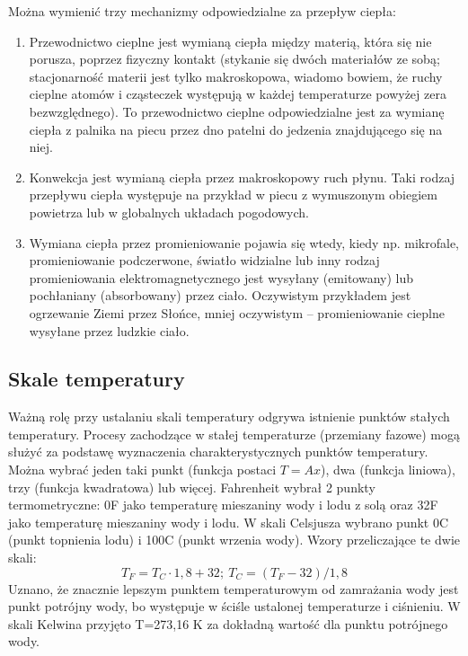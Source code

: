 \documentclass{article}
\begin{document}
Można wymienić trzy mechanizmy odpowiedzialne za przepływ ciepła:
\begin{enumerate} 
    \item Przewodnictwo cieplne jest wymianą ciepła między materią, która się nie porusza, poprzez fizyczny kontakt (stykanie się dwóch materiałów ze sobą; stacjonarność materii jest tylko makroskopowa, wiadomo bowiem, że ruchy cieplne atomów i cząsteczek występują w każdej temperaturze powyżej zera bezwzględnego). To przewodnictwo cieplne odpowiedzialne jest za wymianę ciepła z palnika na piecu przez dno patelni do jedzenia znajdującego się na niej.
    \item Konwekcja jest wymianą ciepła przez makroskopowy ruch płynu. Taki rodzaj przepływu ciepła występuje na przykład w piecu z wymuszonym obiegiem powietrza lub w globalnych układach pogodowych.
    \item Wymiana ciepła przez promieniowanie pojawia się wtedy, kiedy np. mikrofale, promieniowanie podczerwone, światło widzialne lub inny rodzaj promieniowania elektromagnetycznego jest wysyłany (emitowany) lub pochłaniany (absorbowany) przez ciało. Oczywistym przykładem jest ogrzewanie Ziemi przez Słońce, mniej oczywistym – promieniowanie cieplne wysyłane przez ludzkie ciało.
\end{enumerate}

\subsection{Skale temperatury}
Ważną rolę przy ustalaniu skali temperatury odgrywa istnienie punktów stałych temperatury. Procesy zachodzące w stałej temperaturze (przemiany fazowe) mogą służyć za podstawę wyznaczenia charakterystycznych punktów temperatury. Można wybrać jeden taki punkt (funkcja postaci $T=Ax$), dwa (funkcja liniowa), trzy (funkcja kwadratowa) lub więcej. Fahrenheit wybrał 2 punkty termometryczne: 0\degree F jako temperaturę mieszaniny wody i lodu z solą oraz 32\degree F jako temperaturę mieszaniny wody i lodu. W skali Celsjusza wybrano punkt 0\degree C (punkt topnienia lodu) i 100\degree C (punkt wrzenia wody). Wzory przeliczające te dwie skali:
\begin{equation*}
    T_F = T_C\cdot 1,8 + 32; \
    T_C = (T_F-32)/1,8
\end{equation*}
Uznano, że znacznie lepszym punktem temperaturowym od zamrażania wody jest punkt potrójny wody, bo występuje w ściśle ustalonej temperaturze i ciśnieniu. W skali Kelwina przyjęto T=273,16 K za dokładną wartość dla punktu potrójnego wody. 
\end{document}
